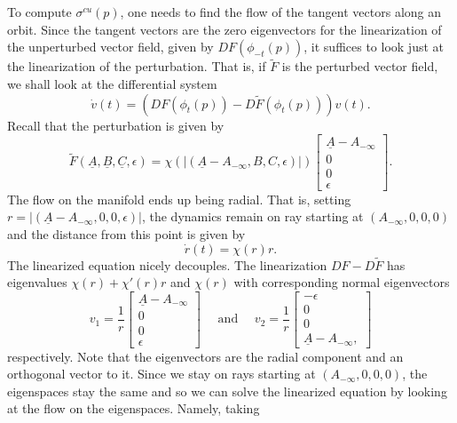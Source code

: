 To compute \(\sigma^{cu}(p)\), one needs to find the flow of the tangent vectors along an orbit. Since the tangent vectors are the zero eigenvectors for the linearization of the unperturbed vector field, given by \(DF(\phi_{-t}(p))\), it suffices to look just at the linearization of the perturbation. That is, if \(\tilde F\) is the perturbed vector field, we shall look at the differential system
\begin{equation}\label{linearize-pertubation-ode}
	\dot v(t) = (DF(\phi_{t} (p)) - D\tilde F(\phi_t (p))) v(t).
\end{equation}
Recall that the perturbation is given by 
\begin{equation*}
	\tilde F(\underline A, \underline B, \underline C, \epsilon) = \chi(|(\underline A-A_{-\infty} , B, C, \epsilon)|) \begin{bmatrix}
		\underline A - A_{-\infty} \\ 0 \\ 0 \\ \epsilon
	\end{bmatrix}.
\end{equation*}
The flow on the manifold ends up being radial. That is, setting \(r = |(\underline A-A_{-\infty}, 0, 0, \epsilon)|\), the dynamics remain on ray starting at \((A_{-\infty}, 0,0,0)\) and the distance from this point is given by 
\begin{equation*}
	\dot r(t) = \chi(r) r.
\end{equation*}
The linearized equation nicely decouples. The linearization \(DF - D\tilde F\) has eigenvalues \(\chi(r) + \chi'(r)r\) and \(\chi(r)\) with corresponding normal eigenvectors
\begin{equation*}
	v_1 = \frac 1 r\begin{bmatrix}
		\underline A - A_{-\infty} \\ 0 \\ 0 \\ \epsilon 
	\end{bmatrix} \quad \text{ and } \quad  v_2 = \frac 1 r \begin{bmatrix}
	-\epsilon \\ 0 \\ 0 \\ \underline A - A_{-\infty}, 
\end{bmatrix} 
\end{equation*}
respectively. Note that the eigenvectors are the radial component and an orthogonal vector to it. Since we stay on rays starting at \((A_{-\infty}, 0, 0, 0)\), the eigenspaces stay the same and so we can solve the linearized equation by looking at the flow on the eigenspaces. Namely, taking 
